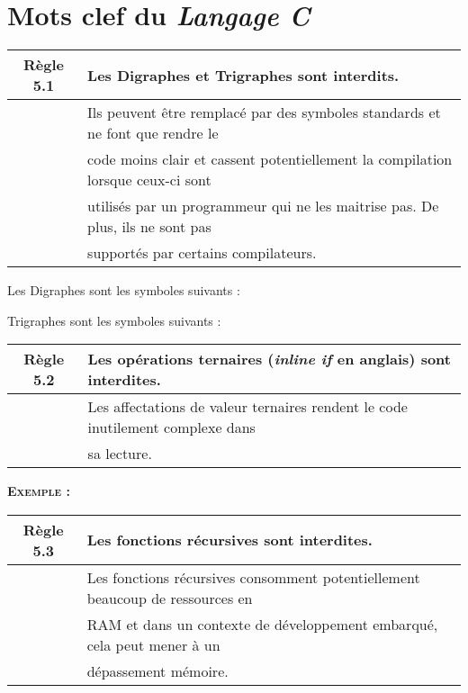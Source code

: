 \section{Mots clef du \textit{Langage C}}

\begin{center}
\begin{tabular}{|c l|}
\hline
\rowcolor{red!10}\textbf{Règle 5.1} & Les Digraphes et Trigraphes sont interdits. \\ \hline
 & Ils peuvent être remplacé par des symboles standards et ne font que rendre le \\
 & code moins clair et cassent potentiellement la compilation lorsque ceux-ci sont \\
 & utilisés par un programmeur qui ne les maitrise pas. De plus, ils ne sont pas \\
 & supportés par certains compilateurs. \\ \hline
\hline
\end{tabular}
\end{center}

\smallskip 

Les Digraphes sont les symboles suivants :
\smallskip 



Trigraphes sont les symboles suivants :
\smallskip 


\medskip

\begin{center}
\begin{tabular}{|c l|}
\hline
\rowcolor{red!10}\textbf{Règle 5.2} & Les opérations ternaires (\textit{inline if} en anglais) sont interdites. \\ \hline
 & Les affectations de valeur ternaires rendent le code inutilement complexe dans \\
 & sa lecture.\\ \hline
\hline
\end{tabular}
\end{center}

\smallskip 

\begin{large}
\textbf{\textsc{Exemple :}}
\end{large}
\smallskip


\medskip

\begin{center}
\begin{tabular}{|c l|}
\hline
\rowcolor{red!10}\textbf{Règle 5.3} & Les fonctions récursives sont interdites. \\ \hline
 & Les fonctions récursives consomment potentiellement beaucoup de ressources en \\
 & RAM et dans un contexte de développement embarqué, cela peut mener à un \\
 & dépassement mémoire.\\ \hline
\hline
\end{tabular}
\end{center}

